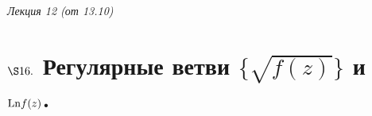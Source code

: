 \begin{flushright}
    \textit{Лекция 12 (от 13.10)}
\end{flushright}
\section{$\S 16.$ Регулярные ветви $\{\sqrt{f(z)}\}$ и $\mathrm{Ln} f(z)$.}